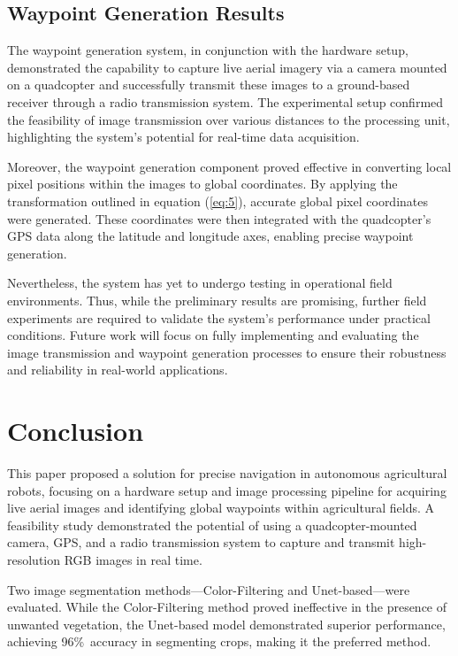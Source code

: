 \documentclass[conference]{IEEEtran}
\begin{document}
\subsection{Waypoint Generation Results}

The waypoint generation system, in conjunction with the hardware setup, demonstrated the capability to capture live aerial imagery via a camera mounted on a quadcopter and successfully transmit these images to a ground-based receiver through a radio transmission system. The experimental setup confirmed the feasibility of image transmission over various distances to the processing unit, highlighting the system’s potential for real-time data acquisition.

Moreover, the waypoint generation component proved effective in converting local pixel positions within the images to global coordinates. By applying the transformation outlined in equation (\ref{eq:5}), accurate global pixel coordinates were generated. These coordinates were then integrated with the quadcopter’s GPS data along the latitude and longitude axes, enabling precise waypoint generation.

Nevertheless, the system has yet to undergo testing in operational field environments. Thus, while the preliminary results are promising, further field experiments are required to validate the system’s performance under practical conditions. Future work will focus on fully implementing and evaluating the image transmission and waypoint generation processes to ensure their robustness and reliability in real-world applications.
	
	\section{Conclusion}\label{Conclusion}
This paper proposed a solution for precise navigation in autonomous agricultural robots, focusing on a hardware setup and image processing pipeline for acquiring live aerial images and identifying global waypoints within agricultural fields. A feasibility study demonstrated the potential of using a quadcopter-mounted camera, GPS, and a radio transmission system to capture and transmit high-resolution RGB images in real time.

Two image segmentation methods—Color-Filtering and Unet-based—were evaluated. While the Color-Filtering method proved ineffective in the presence of unwanted vegetation, the Unet-based model demonstrated superior performance, achieving 96\%\ accuracy in segmenting crops, making it the preferred method.
\end{document}
